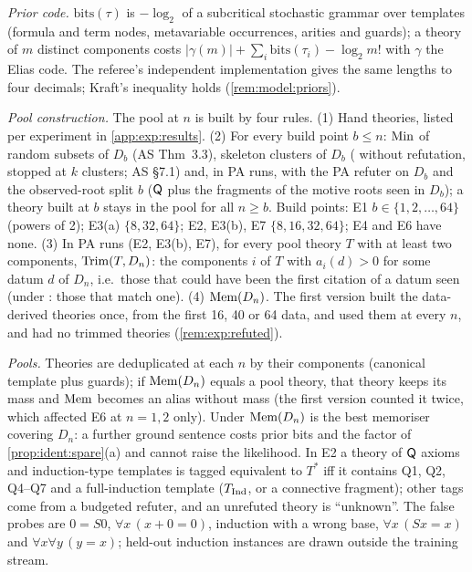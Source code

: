 \emph{Prior code.} $\mathrm{bits}(\tau)$ is $-\log_2$ of a subcritical stochastic grammar over templates (formula and term nodes, metavariable occurrences, arities and guards); a theory of $m$ distinct components costs $|\gamma(m)|+\sum_i\mathrm{bits}(\tau_i)-\log_2m!$ with $\gamma$ the Elias code. The referee's independent implementation gives the same lengths to four decimals; Kraft's inequality holds (\cref{rem:model:priors}).

\emph{Pool construction.} The pool at $n$ is built by four rules. (1) Hand theories, listed per experiment in \cref{app:exp:results}. (2) For every build point $b\le n$: $\mathrm{Min}$ of random subsets of $D_b$ (AS Thm~3.3), skeleton clusters of $D_b$ (\DTRC{} without refutation, stopped at $k$ clusters; AS \S7.1) and, in PA runs, \DTRC{} with the PA refuter on $D_b$ and the observed-root split $b$ ($\mathsf{Q}$ plus the fragments of the motive roots seen in $D_b$); a theory built at $b$ stays in the pool for all $n\ge b$. Build points: E1 $b\in\{1,2,\dots,64\}$ (powers of 2); E3(a) $\{8,32,64\}$; E2, E3(b), E7 $\{8,16,32,64\}$; E4 and E6 have none. (3) In PA runs (E2, E3(b), E7), for every pool theory $T$ with at least two components, $\mathrm{Trim}(T,D_n)$: the components $i$ of $T$ with $a_i(d)>0$ for some datum $d$ of $D_n$, i.e.\ those that could have been the first citation of a datum seen (under \Lzero: those that match one). (4) $\mathrm{Mem}(D_n)$. The first version built the data-derived theories once, from the first 16, 40 or 64 data, and used them at every $n$, and had no trimmed theories (\cref{rem:exp:refuted}).

\emph{Pools.} Theories are deduplicated at each $n$ by their components (canonical template plus guards); if $\mathrm{Mem}(D_n)$ equals a pool theory, that theory keeps its mass and $\mathrm{Mem}$ becomes an alias without mass (the first version counted it twice, which affected E6 at $n=1,2$ only). Under \Lzero{} $\mathrm{Mem}(D_n)$ is the best memoriser covering $D_n$: a further ground sentence costs prior bits and the factor of \cref{prop:ident:spare}(a) and cannot raise the likelihood. In E2 a theory of $\mathsf{Q}$ axioms and induction-type templates is tagged equivalent to $T^*$ iff it contains Q1, Q2, Q4--Q7 and a full-induction template ($T_{\mathrm{Ind}}$,  or a connective fragment); other tags come from a budgeted refuter, and an unrefuted theory is ``unknown''. The false probes are $0=S0$, $\forall x\,(x+0=0)$, induction with a wrong base, $\forall x\,(Sx=x)$ and $\forall x\forall y\,(y=x)$; held-out induction instances are drawn outside the training stream.

